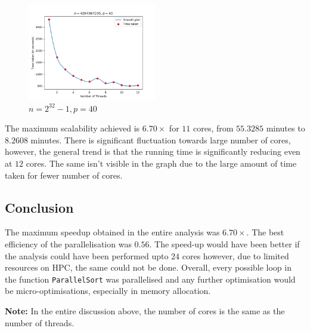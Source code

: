 \documentclass[11pt]{article}
\begin{document}
\begin{figure}[H]
	\begin{center}
		\includegraphics[width=0.5\textwidth]{outputs/4294967295_40_t12.png}
	\end{center}
	\caption{$n = 2^{32} - 1, p = 40$}
	\label{fig:4294967295_40}
\end{figure}
The maximum scalability achieved is $6.70\times$ for $11$ cores, from $55.3285$ minutes to $8.2608$ minutes. There is significant fluctuation towards large number of cores, however, the general trend is that the running time is significantly reducing even at $12$ cores. The same isn't visible in the graph due to the large amount of time taken for fewer number of cores.

\subsection{Conclusion}
The maximum speedup obtained in the entire analysis was $6.70\times$. The best efficiency of the parallelisation was $0.56$. The speed-up would have been better if the analysis could have been performed upto $24$ cores however, due to limited resources on HPC, the same could not be done. Overall, every possible loop in the function \texttt{ParallelSort} was parallelised and any further optimisation would be micro-optimisations, especially in memory allocation.\par
\textbf{Note:} In the entire discussion above, the number of cores is the same as the number of threads.
\end{document}
